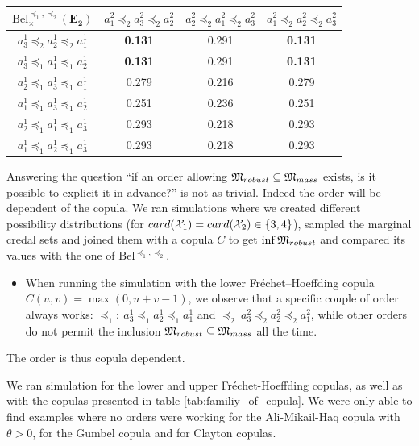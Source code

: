 \begin{example}
\begin{center}
\begin{tabular}{|c||c|c|c|}
\hline
$\mathrm{Bel}^{\preceq_1,\preceq_2}_\times(\mathbf{E_2})$ & $a^2_1\preceq_2a^2_3\preceq_2a^2_2$ & $a^2_2\preceq_2a^2_1\preceq_2a^2_3$ & $a^2_1\preceq_2a^2_2\preceq_2a^2_3$ \\ \hline\hline
$a^1_3\preceq_2a^1_2\preceq_2a^1_1$ & \textbf{0.131} & 0.291 & \textbf{0.131} \\ \hline
$a^1_3\preceq_1a^1_1\preceq_1a^1_2$ & \textbf{0.131} & 0.291 & \textbf{0.131} \\ \hline
$a^1_2\preceq_1a^1_3\preceq_1a^1_1$ & 0.279 & 0.216 & 0.279 \\ \hline
$a^1_1\preceq_1a^1_3\preceq_1a^1_2$ & 0.251 & 0.236 & 0.251 \\ \hline
$a^1_2\preceq_1a^1_1\preceq_1a^1_3$ & 0.293 & 0.218 & 0.293 \\ \hline
$a^1_1\preceq_1a^1_2\preceq_1a^1_3$ & 0.293 & 0.218 & 0.293 \\ \hline
\end{tabular}
\label{tab:beliefs_orders}
\end{center}

Answering the question ``if an order allowing ${\mathfrak{M}}_{robust}\subseteq{\mathfrak{M}}_{mass}$ exists, is it possible to explicit it in advance?'' is not as trivial. Indeed the order will be dependent of the copula. We ran simulations where we created different possibility distributions (for $card({\mathcal{X}}_1)=card({\mathcal{X}}_2)\in\{3,4\}$), sampled the marginal credal sets and joined them with a copula $C$ to get $\inf{\mathfrak{M}}_{robust}$ and compared its values with the one of $\mathrm{Bel}^{\preceq_1,\preceq_2}$.
\begin{itemize}
	\item When running the simulation with the lower Fréchet–Hoeffding copula $C(u,v)=\max(0,u+v-1)$, we observe that a specific couple of order always works: $\preceq_1:~a^1_3\preceq_1a^1_2\preceq_1a^1_1$ and $\preceq_2~a^2_3\preceq_2a^2_2\preceq_2a^2_1$, while other orders do not permit the inclusion ${\mathfrak{M}}_{robust}\subseteq{\mathfrak{M}}_{mass}$ all the time.
\end{itemize}
The order is thus copula dependent.

We ran simulation for the lower and upper Fréchet-Hoeffding copulas, as well as with the copulas presented in table \ref{tab:familiy_of_copula}. We were only able to find examples where no orders were working for the Ali-Mikail-Haq copula with $\theta>0$, for the Gumbel copula and for Clayton copulas. 
\end{example}
\pagebreak